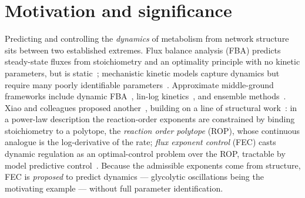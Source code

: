 \documentclass[11pt]{article}
\begin{document}
\section{Motivation and significance}
Predicting and controlling the \emph{dynamics} of metabolism from network structure sits
between two established extremes. Flux balance analysis (FBA) predicts steady-state fluxes
from stoichiometry and an optimality principle with no kinetic parameters, but is
static~\citep{orth2010fba,varma1994stoichiometric}; mechanistic kinetic models capture
dynamics but require many poorly identifiable parameters~\citep{saa2017kinetic}. Approximate
middle-ground frameworks include dynamic FBA~\citep{mahadevan2002dfba}, lin-log
kinetics~\citep{hatzimanikatis1997loglinear,visser2003linlog}, and ensemble
methods~\citep{miskovic2010oracle,smallbone2007bridging}. Xiao and colleagues proposed
another~\citep{xiao2023fec}, building on a line of structural work~\citep{xiao2022thesis,xiao2021structure,xiao2018rpa}: in a power-law description the reaction-order
exponents are constrained by binding stoichiometry to a polytope, the \emph{reaction order
polytope} (ROP), whose continuous analogue is the log-derivative of the rate; \emph{flux
exponent control} (FEC) casts dynamic regulation as an optimal-control problem over the ROP,
tractable by model predictive control~\citep{rawlings2017mpc,bemporad1999survey}. Because the admissible
exponents come from structure, FEC is \emph{proposed} to predict dynamics --- glycolytic oscillations
being the motivating example --- without full parameter identification.
\end{document}
